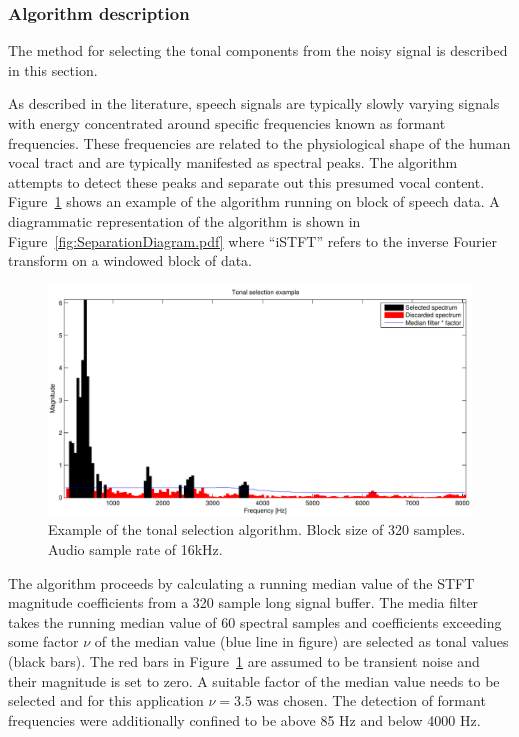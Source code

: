 \subsubsection{Algorithm description}
The method for selecting the tonal components from the noisy signal is described in this section.

As described in the literature, speech signals are typically slowly varying signals with energy concentrated around specific frequencies known as formant frequencies. These frequencies are related to the physiological shape of the human vocal tract and are typically manifested as spectral peaks\cite{Fant1970}. The algorithm attempts to detect these peaks and separate out this presumed vocal content. Figure~\ref{fig:Separation_Spectrum_Selection.pdf} shows an example of the algorithm running on block of speech data. A diagrammatic representation of the algorithm is shown in Figure~\ref{fig:SeparationDiagram.pdf} where ``iSTFT'' refers to the inverse Fourier transform on a windowed block of data.

\begin{figure} %
\begin{minipage}[b]{1.0\linewidth}
  \centering
  \centerline{\includegraphics[width=14cm]{Separation_Spectrum_Selection.pdf}}
\end{minipage}
\caption{Example of the tonal selection algorithm. Block size of 320 samples. Audio sample rate of 16kHz.}
\label{fig:Separation_Spectrum_Selection.pdf}
\end{figure}

The algorithm proceeds by calculating a running median value of the STFT magnitude coefficients from a 320 sample long signal buffer. The media filter takes the running median value of 60 spectral samples and coefficients exceeding some factor $\nu$ of the median value (blue line in figure) are selected as tonal values (black bars). The red bars in Figure~\ref{fig:Separation_Spectrum_Selection.pdf} are assumed to be transient noise and their magnitude is set to zero. A suitable factor of the median value needs to be selected and for this application $\nu = 3.5$ was chosen. The detection of formant frequencies were additionally confined to be above 85 Hz and below 4000 Hz.

